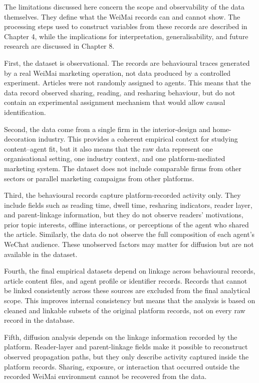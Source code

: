 The limitations discussed here concern the scope and observability of the data themselves. They define what the WeiMai records can and cannot show. The processing steps used to construct variables from these records are described in Chapter 4, while the implications for interpretation, generalisability, and future research are discussed in Chapter 8.

First, the dataset is observational. The records are behavioural traces generated by a real WeiMai marketing operation, not data produced by a controlled experiment. Articles were not randomly assigned to agents. This means that the data record observed sharing, reading, and resharing behaviour, but do not contain an experimental assignment mechanism that would allow causal identification.

Second, the data come from a single firm in the interior-design and home-decoration industry. This provides a coherent empirical context for studying content–agent fit, but it also means that the raw data represent one organisational setting, one industry context, and one platform-mediated marketing system. The dataset does not include comparable firms from other sectors or parallel marketing campaigns from other platforms.

Third, the behavioural records capture platform-recorded activity only. They include fields such as reading time, dwell time, resharing indicators, reader layer, and parent-linkage information, but they do not observe readers’ motivations, prior topic interests, offline interactions, or perceptions of the agent who shared the article. Similarly, the data do not observe the full composition of each agent’s WeChat audience. These unobserved factors may matter for diffusion but are not available in the dataset.

Fourth, the final empirical datasets depend on linkage across behavioural records, article content files, and agent profile or identifier records. Records that cannot be linked consistently across these sources are excluded from the final analytical scope. This improves internal consistency but means that the analysis is based on cleaned and linkable subsets of the original platform records, not on every raw record in the database.

Fifth, diffusion analysis depends on the linkage information recorded by the platform. Reader-layer and parent-linkage fields make it possible to reconstruct observed propagation paths, but they only describe activity captured inside the platform records. Sharing, exposure, or interaction that occurred outside the recorded WeiMai environment cannot be recovered from the data.

